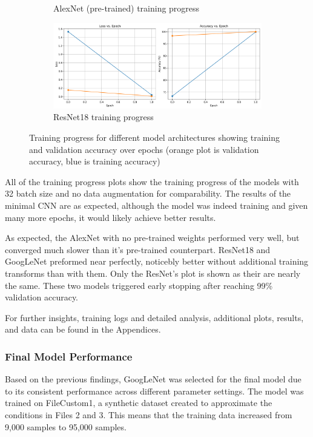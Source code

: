 \documentclass[conference]{IEEEtran}
\begin{document}
\begin{figure}[h]
\begin{subfigure}[b]{0.45\textwidth}
      \caption{AlexNet (pre-trained) training progress}
      \label{fig:progress_alexnet}
    \end{subfigure}
    \hfill
    \begin{subfigure}[b]{0.45\textwidth}
        \centering
        \includegraphics[width=\textwidth]{images/training_progress_ResNet.png}
        \caption{ResNet18 training progress}
        \label{fig:progress_resnet}
    \end{subfigure}
    \caption{Training progress for different model architectures showing training and validation accuracy over epochs (orange plot is validation accuracy,
    blue is training accuracy)}
    \label{fig:training_progress}
\end{figure}

All of the training progress plots show the training progress of the models with 32 batch size and no data augmentation for comparability.
The results of the minimal CNN are as expected, although the model was indeed training and given many more epochs, it would likely achieve better results.  

As expected, the AlexNet with no pre-trained weights performed very well, but converged much slower than it's pre-trained counterpart.
ResNet18 and GoogLeNet preformed near perfectly, noticebly better without additional training transforms than with them. Only the ResNet's plot
is shown as their are nearly the same. These two models triggered early stopping after reaching 99\% validation accuracy.

For further insights, training logs and detailed analysis, additional plots, results, and data can be found in the Appendices.

\subsubsection{Final Model Performance}

Based on the previous findings, GoogLeNet was selected for the final model due to its consistent performance across different parameter settings.
The model was trained on FileCustom1, a synthetic dataset created to approximate the conditions in Files 2 and 3. This means that the training
data increased from 9,000 samples to 95,000 samples.
\end{document}
